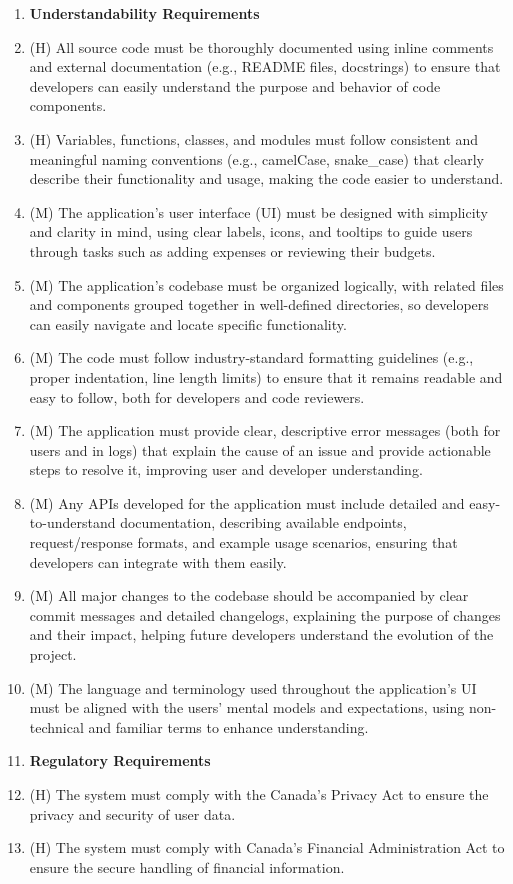 \documentclass[12pt]{article}
\begin{document}
\begin{enumerate}[label=NFR\arabic*]
  \item[] \textbf{Understandability Requirements} 
  \item (H) All source code must be thoroughly documented using inline comments
  and external documentation (e.g., README files, docstrings) to ensure that
  developers can easily understand the purpose and behavior of code components.
  \item (H) Variables, functions, classes, and modules must follow consistent
  and meaningful naming conventions (e.g., camelCase, snake\_case) that clearly
  describe their functionality and usage, making the code easier to understand.
  \item (M) The application's user interface (UI) must be designed with
  simplicity and clarity in mind, using clear labels, icons, and tooltips to
  guide users through tasks such as adding expenses or reviewing their budgets.
  \item (M) The application's codebase must be organized logically, with related
  files and components grouped together in well-defined directories, so
  developers can easily navigate and locate specific functionality.
  \item (M) The code must follow industry-standard formatting guidelines (e.g.,
  proper indentation, line length limits) to ensure that it remains readable and
  easy to follow, both for developers and code reviewers.
  \item (M) The application must provide clear, descriptive error messages (both
  for users and in logs) that explain the cause of an issue and provide
  actionable steps to resolve it, improving user and developer understanding.
  \item (M) Any APIs developed for the application must include detailed and
  easy-to-understand documentation, describing available endpoints,
  request/response formats, and example usage scenarios, ensuring that
  developers can integrate with them easily.
  \item (M) All major changes to the codebase should be accompanied by clear
  commit messages and detailed changelogs, explaining the purpose of changes and
  their impact, helping future developers understand the evolution of the
  project.
  \item (M) The language and terminology used throughout the application's UI
  must be aligned with the users' mental models and expectations, using
  non-technical and familiar terms to enhance understanding.

  \item[] \textbf{Regulatory Requirements}
  \item (H) The system must comply with the Canada's Privacy Act to ensure the
  privacy and security of user data.
  \item (H) The system must comply with Canada's Financial Administration Act to
  ensure the secure handling of financial information.


\end{enumerate}
\end{document}
